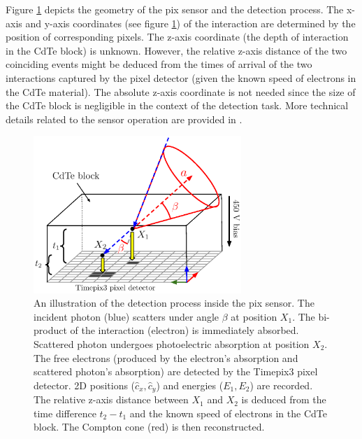 Figure \ref{fig:minipix} depicts the geometry of the \ac{pix} sensor and the detection process.
The x-axis and y-axis coordinates (see figure \ref{fig:minipix}) of the interaction are determined by the position of corresponding pixels.
The z-axis coordinate (the depth of interaction in the CdTe block) is unknown.
However, the relative z-axis distance of the two coinciding events might be deduced from the times of arrival of the two interactions captured by the pixel detector (given the known speed of electrons in the CdTe material).
The absolute z-axis coordinate is not needed since the size of the CdTe block is negligible in the context of the detection task.
More technical details related to the sensor operation are provided in \cite{baca2019timepix}.

\begin{figure}[!h]
    \centering
  \includegraphics[width=0.7\textwidth]{./fig/photos/my_minipix.eps}
    \caption{An illustration of the detection process inside the \ac{pix} sensor. 
    The incident photon (blue) scatters under angle $\beta$ at position $X_{1}$. 
    The bi-product of the interaction (electron) is immediately absorbed. 
    Scattered photon undergoes photoelectric absorption at position $X_{2}$. 
    The free electrons (produced by the electron's absorption and scattered photon's absorption) are detected by the Timepix3 pixel detector. 2D positions ($\hat{c}_{x}, \hat{c}_{y}$) and energies ($E_{1}, E_{2}$) are recorded. 
    The relative z-axis distance between $X_{1}$ and $X_{2}$ is deduced from the time difference $t_{2}-t_{1}$ and the known speed of electrons in the CdTe block.
    The Compton cone (red) is then reconstructed.}
    \label{fig:minipix}
\end{figure}

